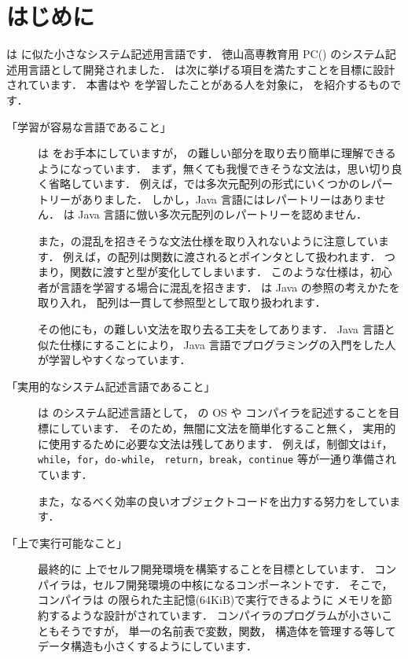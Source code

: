% 
%
\chapter{はじめに}

\cmml は \cl に似た小さなシステム記述用言語です．
徳山高専教育用 PC(\tac) のシステム記述用言語として開発されました．
\cmml は次に挙げる項目を満たすことを目標に設計されています．
本書は\cl や \javal を学習したことがある人を対象に，
\cmml を紹介するものです．

\begin{description}
\item[「学習が容易な言語であること」]
\cmml は \cl をお手本にしていますが，
\cl の難しい部分を取り去り簡単に理解できるようになっています．
まず，無くても我慢できそうな文法は，思い切り良く省略しています．
例えば，\cl では多次元配列の形式にいくつかのレパートリーがありました．
しかし，Java 言語にはレパートリーはありません．
\cmml は Java 言語に倣い多次元配列のレパートリーを認めません．

また，\cl の混乱を招きそうな文法仕様を取り入れないように注意しています．
例えば，\cl の配列は関数に渡されるとポインタとして扱われます．
つまり，関数に渡すと型が変化してしまいます．
このような仕様は，初心者が言語を学習する場合に混乱を招きます．
\cmml は Java の参照の考えかたを取り入れ，
配列は一貫して参照型として取り扱われます．

その他にも，\cl の難しい文法を取り去る工夫をしてあります．
Java 言語と似た仕様にすることにより，
Java 言語でプログラミングの入門をした人が学習しやすくなっています．

\item[「実用的なシステム記述言語であること」]
\cmml は \tac のシステム記述言語として，
\tac の OS や \cmm コンパイラを記述することを目標にしています．
そのため，無闇に文法を簡単化すること無く，
実用的に使用するために必要な文法は残してあります．
例えば，制御文は{\tt if}，{\tt while}，{\tt for}，{\tt do-while}，
{\tt return}，{\tt break}，{\tt continue} 等が一通り準備されています．

また，なるべく効率の良いオブジェクトコードを出力する努力をしています．

\item[「\tac 上で実行可能なこと」]
最終的に \tac 上でセルフ開発環境を構築することを目標としています．
\cmm コンパイラは，セルフ開発環境の中核になるコンポーネントです．
そこで，\cmm コンパイラは \tac の限られた主記憶(64KiB)で実行できるように
メモリを節約するような設計がされています．
コンパイラのプログラムが小さいこともそうですが，
単一の名前表で変数，関数，
構造体を管理する等してデータ構造も小さくするようにしています．


\end{description}

